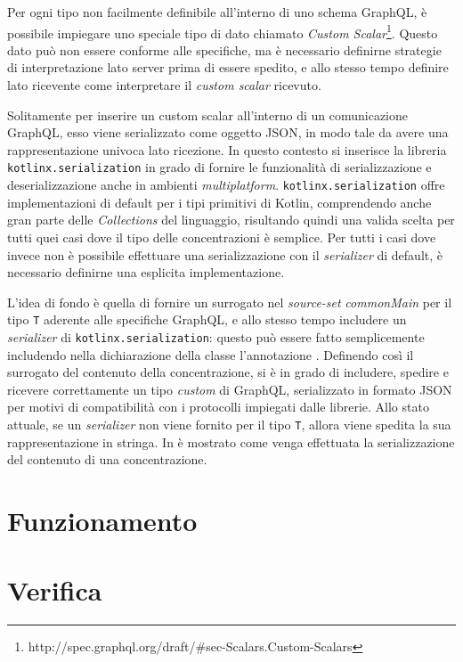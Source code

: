 Per ogni tipo non facilmente definibile all'interno di uno schema GraphQL, è possibile impiegare uno speciale tipo di dato chiamato
\textit{Custom Scalar}\footnote{http://spec.graphql.org/draft/#sec-Scalars.Custom-Scalars}. Questo dato può non essere conforme alle specifiche, ma è
necessario definirne strategie di interpretazione lato server prima di essere spedito, e allo stesso tempo definire lato ricevente come interpretare
il \textit{custom scalar} ricevuto.

Solitamente per inserire un custom scalar all'interno di un comunicazione GraphQL, esso viene serializzato come oggetto JSON, in modo tale da avere
una rappresentazione univoca lato ricezione. In questo contesto si inserisce la libreria \texttt{kotlinx.serialization} in grado di fornire le funzionalità
di serializzazione e deserializzazione anche in ambienti \textit{multiplatform}. \texttt{kotlinx.serialization} offre implementazioni di default per
i tipi primitivi di Kotlin, comprendendo anche gran parte delle \textit{Collections} del linguaggio, risultando quindi una valida scelta per tutti quei
casi dove il tipo delle concentrazioni è semplice. Per tutti i casi dove invece non è possibile effettuare una serializzazione con il \textit{serializer}
di default, è necessario definirne una esplicita implementazione.

L'idea di fondo è quella di fornire un surrogato nel \textit{source-set} \textit{commonMain} per il tipo \texttt{T} aderente alle specifiche GraphQL, e allo
stesso tempo includere un \textit{serializer} di \texttt{kotlinx.serialization}: questo può essere fatto semplicemente includendo nella
dichiarazione della classe l'annotazione . Definendo così il surrogato del contenuto della concentrazione, si è in grado di
includere, spedire e ricevere correttamente un tipo \textit{custom} di GraphQL, serializzato in formato JSON per motivi di compatibilità con i protocolli
impiegati dalle librerie. Allo stato attuale, se un \textit{serializer} non viene fornito per il tipo \texttt{T}, allora viene spedita la sua rappresentazione
in stringa. In  è mostrato come venga effettuata la serializzazione del contenuto di una concentrazione.


\section{Funzionamento}\label{sec:functioning}

\section{Verifica}\label{sec:testing}

